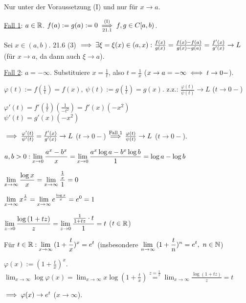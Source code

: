 \documentclass[a4paper,twoside,DIV15,BCOR12mm]{scrbook}
\begin{document}
\begin{beweis}
Nur unter der Voraussetzung (I) und nur für $x \to a$.

\underline{Fall 1}: $a \in \mathbb{R}$. $f(a) := g(a) := 0 \overset{\text{(I)}}{\underset{\text{21.1}}{\implies}} f,g \in C[a,b)$.

Sei $x \in (a,b)$. 21.6 (3) $\implies \exists \xi = \xi(x) \in (a,x): \frac{f(x)}{g(x)} = \frac{f(x)-f(a)}{g(x)-g(a)} = \frac{f'(x)}{g'(x)} \to L$ (für $x \to a$, da dann auch $\xi \to a$).

\underline{Fall 2}: $a = -\infty$. Substituiere $x = \frac{1}{t}$, also $t = \frac{1}{x}$ ($x \to a = -\infty \iff t \to 0-$).

$\varphi(t) := f(\frac{1}{t}) = f(x),\ \psi(t) := g(\frac{1}{t}) = g(x)$. z.z.: $\frac{\varphi(t)}{\psi(t)} \to L$ ($t \to 0-$)

$\varphi'(t) = f'(\frac{1}{t})(\frac{1}{-t^2}) = f'(x)(-x^2)$\\
$\psi'(t) = g'(x)(-x^2)$

$\implies \frac{\varphi'(t)}{\psi'(t)} = \frac{f'(x)}{g'(x)} \to L$ ($t \to 0-$) $\overset{\text{Fall 1}}{\implies} \frac{\varphi(t)}{\psi(t)} \to L$ ($t \to 0-$).
\end{beweis}

\begin{beispiele}
\item $a,b > 0: \displaystyle{\lim_{x \to 0}{\frac{a^x-b^x}{x}}} = \displaystyle{\lim_{x \to 0}{\frac{a^x\log{a} - b^x\log{b}}{1}}} = \log{a} - \log{b}$
\item $\displaystyle{\lim_{x \to \infty}{\frac{\log{x}}{x}}} = \displaystyle{\lim_{x \to \infty}{\frac{\frac{1}{x}}{1}}} = 0$
\item $\displaystyle{\lim_{x \to \infty}{x^{\frac{1}{x}}}} = \displaystyle{\lim_{x \to \infty}{e^{\frac{\log{x}}{x}}}} = e^0 = 1$
\item $\displaystyle{\lim_{z \to 0}{\frac{\log{(1+tz)}}{z}}} = \displaystyle{\lim_{z \to 0}{\frac{\frac{1}{1+tz} \cdot t}{1}}} = t$ ($t \in \mathbb{R}$)
\item Für $t \in \mathbb{R}: \displaystyle{\lim_{x \to \infty}{(1+\frac{t}{x})^x}} = e^t$ (insbesondere $\displaystyle{\lim_{n \to \infty}{(1+\frac{t}{n})^n}} = e^t,\ n \in \mathbb{N}$)
\begin{beweis}
$\varphi(x) := (1+\frac{t}{x})^x.$\\
$\lim_{x \to \infty}{\log{\varphi(x)}} = \lim_{x \to \infty}{x\log{(1+\frac{t}{x})}} \overset{z = \frac{1}{x}}{=} \lim_{x \to \infty}{\frac{\log{(1+tz)}}{z}} = t$

$\implies \varphi(x) \to e^t$ ($x \to \infty$).
\end{beweis}
\end{beispiele}
\end{document}
